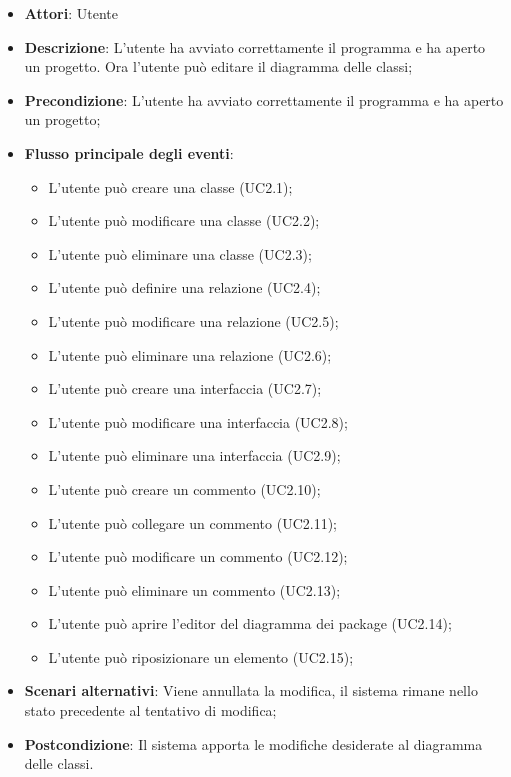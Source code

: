 \documentclass[../AnalisiDeiRequisiti.tex]{subfiles}
\begin{document}
	\begin{itemize}
		\item \textbf{Attori}: Utente
		\item \textbf{Descrizione}: L'utente ha avviato correttamente il programma e ha aperto un progetto. Ora l'utente può editare il diagramma delle classi;
		\item \textbf{Precondizione}: L'utente ha avviato correttamente il programma e ha aperto un progetto;
		\item \textbf{Flusso principale degli eventi}: \begin{itemize}
			\item L'utente può creare una classe (UC2.1);
			\item L'utente può modificare una classe (UC2.2);
			\item L'utente può eliminare una classe (UC2.3);
			\item L'utente può definire una relazione (UC2.4);
			\item L'utente può modificare una relazione (UC2.5);
			\item L'utente può eliminare una relazione (UC2.6);
			\item L'utente può creare una interfaccia (UC2.7);
			\item L'utente può modificare una interfaccia (UC2.8);
			\item L'utente può eliminare una interfaccia (UC2.9);
			\item L'utente può creare un commento (UC2.10);
			\item L'utente può collegare un commento (UC2.11);
			\item L'utente può modificare un commento (UC2.12);
			\item L'utente può eliminare un commento (UC2.13);
			\item L'utente può aprire l'editor del diagramma dei package (UC2.14);
			\item L'utente può riposizionare un elemento (UC2.15);
		\end{itemize}
		\item \textbf{Scenari alternativi}: Viene annullata la modifica, il sistema rimane nello stato precedente al tentativo di modifica;
		\item \textbf{Postcondizione}: Il sistema apporta le modifiche desiderate al diagramma delle classi.
	\end{itemize}
\end{document}
